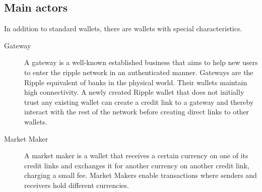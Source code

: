 \subsection{Main actors}
In addition to standard wallets, there are wallets with special characteristics.
\begin{description}
\item[Gateway] A gateway is a well-known established business that aims to help new users to enter the ripple network in an authenticated manner. Gateways are the Ripple equivalent of banks in the physical world. Their wallets maintain high connectivity. A newly created Ripple wallet that does not initially trust any existing wallet can create a credit link to a gateway and thereby interact with the rest of the network before creating direct links to other wallets.
\item[Market Maker] A market maker is a wallet that receives a certain currency on one of its credit links and exchanges it for another currency on another credit link, charging a small fee. Market Makers enable transactions where senders and receivers hold different currencies.
\end{description}


